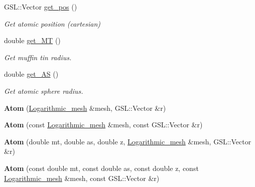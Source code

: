 \begin{DoxyCompactItemize}
\mbox{\label{classAtom_afa5bc441ca3842cc8ed1995009875dda}} 
G\+S\+L\+::\+Vector \hyperlink{classAtom_afa5bc441ca3842cc8ed1995009875dda}{get\+\_\+pos} ()
\begin{DoxyCompactList}\small\item\em Get atomic position (cartesian) \end{DoxyCompactList}\item 
\mbox{\label{classAtom_a5fdba4452d97f59c753fd2b197b1b9aa}} 
double \hyperlink{classAtom_a5fdba4452d97f59c753fd2b197b1b9aa}{get\+\_\+\+MT} ()
\begin{DoxyCompactList}\small\item\em Get muffin tin radius. \end{DoxyCompactList}\item 
\mbox{\label{classAtom_a64112539ea5bcc46016b3239636ed6b9}} 
double \hyperlink{classAtom_a64112539ea5bcc46016b3239636ed6b9}{get\+\_\+\+AS} ()
\begin{DoxyCompactList}\small\item\em Get atomic sphere radius. \end{DoxyCompactList}\item 
\mbox{\label{classAtom_aed38fa78a10d65fe59522e9051f88a49}} 
{\bfseries Atom} (\hyperlink{classLogarithmic__mesh}{Logarithmic\+\_\+mesh} \&mesh, G\+S\+L\+::\+Vector \&r)
\item 
\mbox{\label{classAtom_af09c6e57ec0e1f90caf52b7ba4e90d15}} 
{\bfseries Atom} (const \hyperlink{classLogarithmic__mesh}{Logarithmic\+\_\+mesh} \&mesh, const G\+S\+L\+::\+Vector \&r)
\item 
\mbox{\label{classAtom_a9f289910e2462671634261562f871903}} 
{\bfseries Atom} (double mt, double as, double z, \hyperlink{classLogarithmic__mesh}{Logarithmic\+\_\+mesh} \&mesh, G\+S\+L\+::\+Vector \&r)
\item 
\mbox{\label{classAtom_ab1fe6bd50ca2a6f26f78acedab205267}} 
{\bfseries Atom} (const double mt, const double as, const double z, const \hyperlink{classLogarithmic__mesh}{Logarithmic\+\_\+mesh} \&mesh, const G\+S\+L\+::\+Vector \&r)
\end{DoxyCompactItemize}

